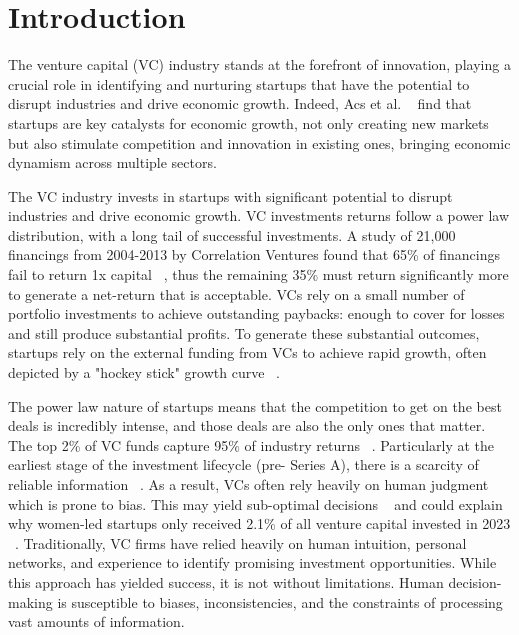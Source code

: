 \documentclass[a4paper, oneside]{discothesis}
\begin{document}
\chapter{Introduction}

The venture capital (VC) industry stands at the forefront of innovation, playing a crucial role
in identifying and nurturing startups that have the potential to disrupt industries and drive
economic growth. Indeed, Acs et al. ~\cite{acs} find that startups are key catalysts for economic growth, 
not only creating new markets but also stimulate competition and innovation in existing ones, bringing economic dynamism across multiple sectors. 

The VC industry invests in startups with significant potential to disrupt industries and drive economic growth. 
VC investments returns follow a power law distribution, with a long tail of successful investments. 
A study of 21,000 financings from 2004-2013 by Correlation Ventures found that 65\% of financings fail to return 1x capital ~\cite{levine2014venture}, 
thus the remaining 35\% must return significantly more to generate a net-return that is acceptable. 
VCs rely on a small number of portfolio investments to achieve outstanding paybacks: enough to cover for losses and
still produce substantial profits. To generate these substantial outcomes, startups rely on the external funding from VCs
to achieve rapid growth, often depicted by a "hockey stick" growth curve ~\cite{marmer}.

The power law nature of startups means that the competition to get on the best deals is incredibly intense, and those 
deals are also the only ones that matter. The top 2\% of VC funds capture 95\% of industry
returns ~\cite{bai}. Particularly at the earliest stage of the investment lifecycle (pre- Series A), there is a scarcity of
reliable information ~\cite{dellermann}. As a result, VCs often rely heavily on human judgment which is prone to bias. 
This may yield sub-optimal decisions ~\cite{cummingdai} and could explain why women-led startups only received 2.1\% of all venture capital invested in 2023 ~\cite{pitchbook2024vc}.
Traditionally, VC firms have relied heavily on human intuition, personal networks, and experience
to identify promising investment opportunities. While this approach has yielded success, it is
not without limitations. Human decision-making is susceptible to biases, inconsistencies, and the
constraints of processing vast amounts of information.
\end{document}
